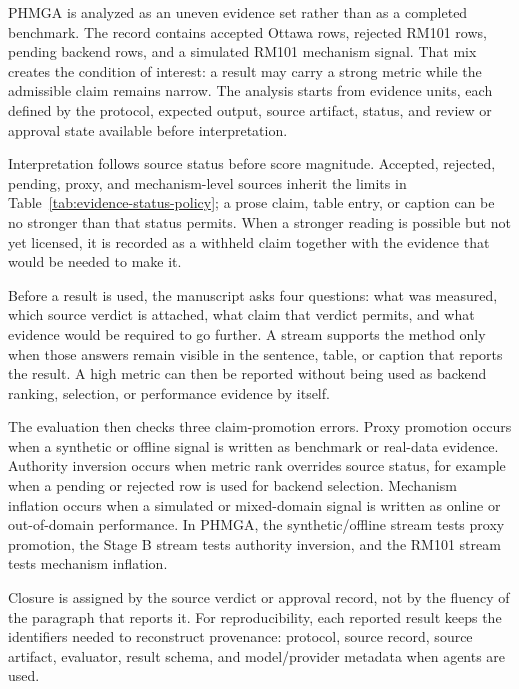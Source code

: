 PHMGA is analyzed as an uneven evidence set rather than as a completed benchmark. The record contains accepted Ottawa rows, rejected RM101 rows, pending backend rows, and a simulated RM101 mechanism signal. That mix creates the condition of interest: a result may carry a strong metric while the admissible claim remains narrow. The analysis starts from evidence units, each defined by the protocol, expected output, source artifact, status, and review or approval state available before interpretation.

Interpretation follows source status before score magnitude. Accepted, rejected, pending, proxy, and mechanism-level sources inherit the limits in Table~\ref{tab:evidence-status-policy}; a prose claim, table entry, or caption can be no stronger than that status permits. When a stronger reading is possible but not yet licensed, it is recorded as a withheld claim together with the evidence that would be needed to make it.

Before a result is used, the manuscript asks four questions: what was measured, which source verdict is attached, what claim that verdict permits, and what evidence would be required to go further. A stream supports the method only when those answers remain visible in the sentence, table, or caption that reports the result. A high metric can then be reported without being used as backend ranking, selection, or performance evidence by itself.

The evaluation then checks three claim-promotion errors. Proxy promotion occurs when a synthetic or offline signal is written as benchmark or real-data evidence. Authority inversion occurs when metric rank overrides source status, for example when a pending or rejected row is used for backend selection. Mechanism inflation occurs when a simulated or mixed-domain signal is written as online or out-of-domain performance. In PHMGA, the synthetic/offline stream tests proxy promotion, the Stage B stream tests authority inversion, and the RM101 stream tests mechanism inflation.

Closure is assigned by the source verdict or approval record, not by the fluency of the paragraph that reports it. For reproducibility, each reported result keeps the identifiers needed to reconstruct provenance: protocol, source record, source artifact, evaluator, result schema, and model/provider metadata when agents are used.
